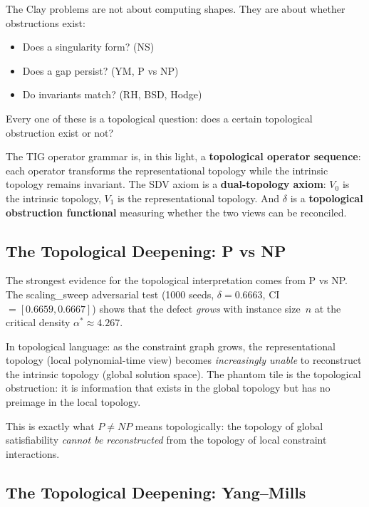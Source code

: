 \documentclass[11pt]{article}
\begin{document}
The Clay problems are not about computing shapes.  They are about whether
obstructions exist:
\begin{itemize}
\item Does a singularity form?  (NS)
\item Does a gap persist?  (YM, P vs NP)
\item Do invariants match?  (RH, BSD, Hodge)
\end{itemize}
Every one of these is a topological question: does a certain topological
obstruction exist or not?

The TIG operator grammar is, in this light, a \textbf{topological operator
sequence}: each operator transforms the representational topology while
the intrinsic topology remains invariant.  The SDV axiom is a
\textbf{dual-topology axiom}: $V_0$ is the intrinsic topology, $V_1$ is
the representational topology.  And $\delta$ is a \textbf{topological
obstruction functional} measuring whether the two views can be reconciled.

\subsection{The Topological Deepening: P vs NP}
\label{subsec:topo-pvsnp}

The strongest evidence for the topological interpretation comes from
P vs NP.  The scaling\_sweep adversarial test (1000 seeds, $\delta = 0.6663$,
CI $= [0.6659, 0.6667]$) shows that the defect \emph{grows} with instance
size~$n$ at the critical density $\alpha^* \approx 4.267$.

In topological language: as the constraint graph grows, the representational
topology (local polynomial-time view) becomes \emph{increasingly unable}
to reconstruct the intrinsic topology (global solution space).  The phantom
tile is the topological obstruction: it is information that exists in the
global topology but has no preimage in the local topology.

This is exactly what $P \neq NP$ means topologically: the topology of
global satisfiability \emph{cannot be reconstructed} from the topology of
local constraint interactions.

\subsection{The Topological Deepening: Yang--Mills}
\label{subsec:topo-ym}
\end{document}
